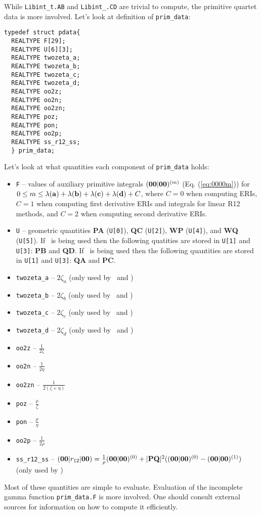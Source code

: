 \documentclass[12pt]{article}
\begin{document}
While {\tt Libint\_t.AB} and {\tt Libint\_.CD} are trivial to compute,
the primitive quartet data is more involved. Let's look at definition of {\tt prim\_data}:
\begin{verbatim}
typedef struct pdata{
  REALTYPE F[29];
  REALTYPE U[6][3];
  REALTYPE twozeta_a;
  REALTYPE twozeta_b;
  REALTYPE twozeta_c;
  REALTYPE twozeta_d;
  REALTYPE oo2z;
  REALTYPE oo2n;
  REALTYPE oo2zn;
  REALTYPE poz;
  REALTYPE pon;
  REALTYPE oo2p;
  REALTYPE ss_r12_ss;
  } prim_data;
\end{verbatim}
Let's look at what quantities each component of {\tt prim\_data} holds:
\begin{itemize}
\item {\tt F} -- values of auxiliary primitive integrals $({\bf 00}|{\bf 00})^{(m)}$ (Eq. (\ref{eq:0000m}))
for $0 \leq m \leq \lambda({\bf a}) + \lambda({\bf b}) + \lambda({\bf c}) + \lambda({\bf d}) + C$,
where $C = 0$ when computing ERIs, $C=1$ when computing first derivative ERIs and integrals for
linear R12 methods, and $C=2$ when computing second derivative ERIs.
\item {\tt U} -- geometric quantities {\bf PA} ({\tt U[0]}), {\bf QC} ({\tt U[2]}),
{\bf WP} ({\tt U[4]}), and {\bf WQ} ({\tt U[5]}). If \libderiv\ is being used then
the following quatities are stored in {\tt U[1]} and {\tt U[3]}: {\bf PB} and {\bf QD}.
If \librij\ is being used then
the following quantities are stored in {\tt U[1]} and {\tt U[3]}: {\bf QA} and {\bf PC}.
\item {\tt twozeta\_a} -- $2 \zeta_a$ (only used by \libderiv\ and \librij)
\item {\tt twozeta\_b} -- $2 \zeta_b$ (only used by \libderiv\ and \librij)
\item {\tt twozeta\_c} -- $2 \zeta_c$ (only used by \libderiv\ and \librij)
\item {\tt twozeta\_d} -- $2 \zeta_d$ (only used by \libderiv\ and \librij)
\item {\tt oo2z} -- $\frac{1}{2\zeta}$
\item {\tt oo2n} -- $\frac{1}{2\eta}$
\item {\tt oo2zn} -- $\frac{1}{2(\zeta+\eta)}$
\item {\tt poz} -- $\frac{\rho}{\zeta}$
\item {\tt pon} -- $\frac{\rho}{\eta}$
\item {\tt oo2p} -- $\frac{1}{2\rho}$
\item {\tt ss\_r12\_ss} -- $({\bf 00}|r_{12}|{\bf 00}) = \frac{1}{\rho} ({\bf 00}|{\bf 00})^{(0)} +
|{\bf PQ}|^2 (({\bf 00}|{\bf 00})^{(0)} - ({\bf 00}|{\bf 00})^{(1)})$
(only used by \librij)
\end{itemize}
Most of these quantities are simple to evaluate. Evaluation of the incomplete gamma function
{\tt prim\_data.F} is more involved. One should consult external sources for information on how
to compute it efficiently.\cite{Obara86,Gill89}
\end{document}

